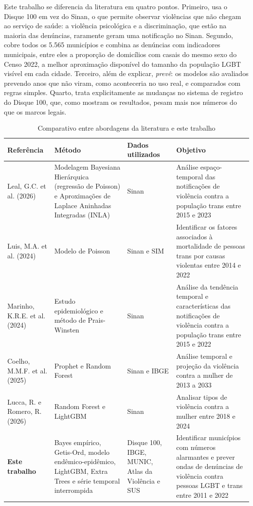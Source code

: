 \documentclass[12pt]{article}
\begin{document}
Este trabalho se diferencia da literatura em quatro pontos. Primeiro, usa o Disque 100 em vez do Sinan, o que permite observar violências que não chegam ao serviço de saúde: a violência psicológica e a discriminação, que estão na maioria das denúncias, raramente geram uma notificação no Sinan. Segundo, cobre todos os 5.565 municípios e combina as denúncias com indicadores municipais, entre eles a proporção de domicílios com casais do mesmo sexo do Censo 2022, a melhor aproximação disponível do tamanho da população LGBT visível em cada cidade. Terceiro, além de explicar, \textit{prevê}: os modelos são avaliados prevendo anos que não viram, como aconteceria no uso real, e comparados com regras simples. Quarto, trata explicitamente as mudanças no sistema de registro do Disque 100, que, como mostram os resultados, pesam mais nos números do que os marcos legais.

\begin{table}[H]
\centering
\caption{Comparativo entre abordagens da literatura e este trabalho}
{\renewcommand{\arraystretch}{1.5}

\begin{tabular}{>{\raggedright\arraybackslash}p{3.2cm} >{\raggedright\arraybackslash}p{3.2cm} >{\raggedright\arraybackslash}p{3.2cm} >{\raggedright\arraybackslash}p{3.2cm}}
\hline
\textbf{Referência} & \textbf{Método} & \textbf{Dados utilizados} & \textbf{Objetivo}\\
\hline
Leal, G.C. et al. (2026) & Modelagem Bayesiana Hierárquica (regressão de Poisson) e Aproximações de Laplace Aninhadas Integradas (INLA) & Sinan & Análise espaço-temporal das notificações de violência contra a população trans entre 2015 e 2023
\\
Luis, M.A. et al. (2024) & Modelo de Poisson & Sinan e SIM & Identificar os fatores associados à mortalidade de pessoas trans por causas violentas entre 2014 e 2022
\\
Marinho, K.R.E. et al. (2024) & Estudo epidemiológico e método de Prais-Winsten & Sinan & Análise da tendência temporal e características das notificações de violência contra a população trans entre 2015 e 2022
\\
Coelho, M.M.F. et al. (2025) & Prophet e Random Forest & Sinan e IBGE & Análise temporal e projeção da violência contra a mulher de 2013 a 2033
\\
Lucca, R. e Romero, R. (2026) & Random Forest e LightGBM & Sinan & Analisar tipos de violência contra a mulher entre 2018 e 2024
\\
\hline
\textbf{Este trabalho} & Bayes empírico, Getis-Ord, modelo endêmico-epidêmico, LightGBM, Extra Trees e série temporal interrompida & Disque 100, IBGE, MUNIC, Atlas da Violência e SUS & Identificar municípios com números alarmantes e prever ondas de denúncias de violência contra pessoas LGBT e trans entre 2011 e 2022
\\
\hline
\end{tabular}
}
\label{tab:referencia}
\end{table}
\end{document}
